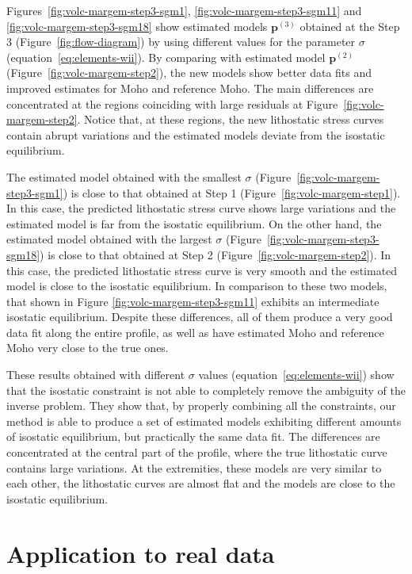 \documentclass[manuscript]{geophysics}
\begin{document}
Figures~\ref{fig:volc-margem-step3-sgm1}, \ref{fig:volc-margem-step3-sgm11} and 
\ref{fig:volc-margem-step3-sgm18} show estimated models $\mathbf{p}^{(3)}$ obtained at
the Step 3 (Figure~\ref{fig:flow-diagram}) by using different values for the parameter 
$\sigma$ (equation~\ref{eq:elements-wii}).
By comparing with estimated model $\mathbf{p}^{(2)}$
(Figure~\ref{fig:volc-margem-step2}), the new models 
show better data fits and improved estimates for Moho and reference Moho.
The main differences are concentrated at the regions coinciding with
large residuals at Figure~\ref{fig:volc-margem-step2}.
Notice that, at these regions, the new lithostatic stress curves contain abrupt
variations and the estimated models deviate from the isostatic equilibrium.

The estimated model obtained with 
the smallest $\sigma$ (Figure~\ref{fig:volc-margem-step3-sgm1}) is close to that 
obtained at Step 1 (Figure~\ref{fig:volc-margem-step1}).
In this case, the predicted lithostatic stress curve shows large variations 
and the estimated model is far from the isostatic equilibrium.
On the other hand, the estimated model obtained with 
the largest $\sigma$ (Figure~\ref{fig:volc-margem-step3-sgm18}) is close to that 
obtained at Step 2 (Figure~\ref{fig:volc-margem-step2}).
In this case, the predicted lithostatic stress curve is very smooth and the 
estimated model is close to the isostatic equilibrium.
In comparison to these two models, that shown in Figure 
\ref{fig:volc-margem-step3-sgm11} exhibits an intermediate isostatic equilibrium.
Despite these differences, all of them produce a very good data fit along the entire profile,
as well as have estimated Moho and reference Moho very close to the true ones. 

These results obtained with different $\sigma$ values (equation~\ref{eq:elements-wii})
show that the isostatic constraint is not able to completely
remove the ambiguity of the inverse problem. They show that, by properly
combining all the constraints, our method is able to
produce a set of estimated models exhibiting different 
amounts of isostatic equilibrium, but practically the same data fit. 
The differences are concentrated at the central part of the profile, where the
true lithostatic curve contains large variations. At the extremities, these models
are very similar to each other, the lithostatic curves are almost flat 
and the models are close to the isostatic equilibrium.


\section{Application to real data}
\end{document}
